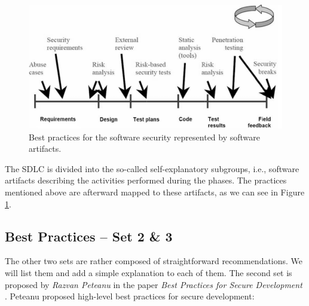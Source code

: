 \documentclass[12pt,a4,twoside]{article}
\begin{document}
\begin{figure}[h]
\centering
\includegraphics[width=.8\textwidth]{figures/best_practices.png}
\caption{Best practices for the software security represented by software artifacts. \cite{davis_secure_software}}
\label{fig:best_practices}
\end{figure}

The SDLC is divided into the so-called self-explanatory subgroups, i.e., software artifacts describing the activities performed during the phases. The practices mentioned above are afterward mapped to these artifacts, as we can see in Figure \ref{fig:best_practices}.

\subsection{Best Practices -- Set 2 \& 3}

The other two sets are rather composed of straightforward recommendations. We will list them and add a simple explanation to each of them. The second set is proposed by \textit{Razvan Peteanu} in the paper \textit{Best Practices for Secure Development} \cite{razvan_best_practices}. Peteanu proposed high-level best practices for secure development:
\end{document}
